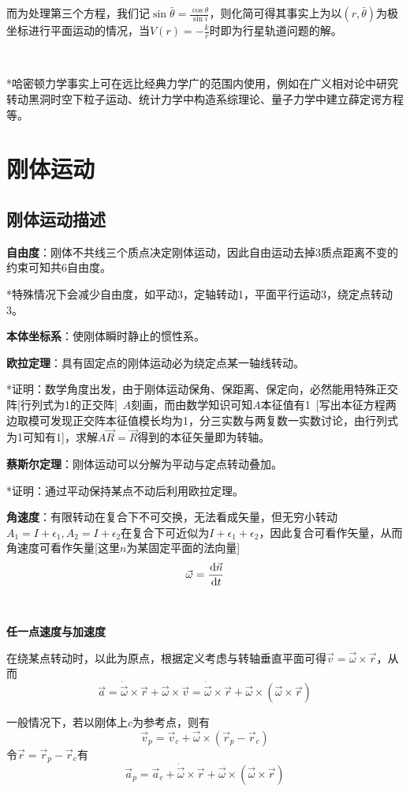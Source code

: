 \documentclass[a4paper,UTF8,fontset=windows]{ctexart}
\newcommand*{\dr}{\hspace{0.07em}\mathrm{d}}
\begin{document}
而为处理第三个方程，我们记$\sin\bar{\theta}=\frac{\cos\theta}{\sin i}$，则化简可得其事实上为以$(r,\bar{\theta})$为极坐标进行平面运动的情况，当$V(r)=-\frac{k}{r}$时即为行星轨道问题的解。

\

*哈密顿力学事实上可在远比经典力学广的范围内使用，例如在广义相对论中研究转动黑洞时空下粒子运动、统计力学中构造系综理论、量子力学中建立薛定谔方程等。


\section{刚体运动}
\subsection{刚体运动描述}
\textbf{自由度}：刚体不共线三个质点决定刚体运动，因此自由运动去掉3质点距离不变的约束可知共6自由度。

*特殊情况下会减少自由度，如平动3，定轴转动1，平面平行运动3，绕定点转动3。

\textbf{本体坐标系}：使刚体瞬时静止的惯性系。

\textbf{欧拉定理}：具有固定点的刚体运动必为绕定点某一轴线转动。

*证明：数学角度出发，由于刚体运动保角、保距离、保定向，必然能用特殊正交阵[行列式为1的正交阵]\ $A$刻画，而由数学知识可知$A$本征值有1\ [写出本征方程两边取模可发现正交阵本征值模长均为1，分三实数与两复数一实数讨论，由行列式为1可知有1]，求解$A\vec{R}=\vec{R}$得到的本征矢量即为转轴。

\textbf{蔡斯尔定理}：刚体运动可以分解为平动与定点转动叠加。

*证明：通过平动保持某点不动后利用欧拉定理。

\textbf{角速度}：有限转动在复合下不可交换，无法看成矢量，但无穷小转动$A_1=I+\epsilon_1,A_2=I+\epsilon_2$在复合下可近似为$I+\epsilon_1+\epsilon_2$，因此复合可看作矢量，从而角速度可看作矢量[这里$n$为某固定平面的法向量]
$$\vec{\omega}=\frac{\dr\vec{n}}{\dr t}$$

\

\textbf{任一点速度与加速度}

在绕某点转动时，以此为原点，根据定义考虑与转轴垂直平面可得$\vec{v}=\vec{\omega}\times\vec{r}$，从而
$$\vec{a}=\dot{\vec{\omega}}\times\vec{r}+\vec{\omega}\times\vec{v}=\dot{\vec{\omega}}\times\vec{r}+\vec{\omega}\times(\vec{\omega}\times\vec{r})$$

一般情况下，若以刚体上$c$为参考点，则有
$$\vec{v}_p=\vec{v}_c+\vec{\omega}\times(\vec{r}_p-\vec{r}_c)$$
令$\vec{r}=\vec{r}_p-\vec{r}_c$有
$$\vec{a}_p=\vec{a}_c+\dot{\vec{\omega}}\times\vec{r}+\vec{\omega}\times(\vec{\omega}\times\vec{r})$$
\end{document}
